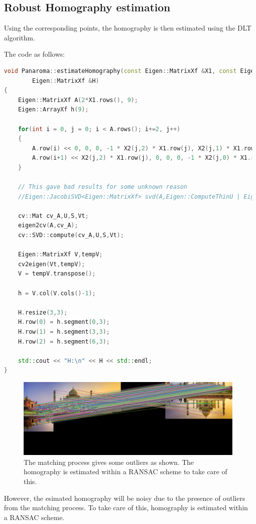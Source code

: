 \documentclass[a4paper,11]{article}
\begin{document}
  \subsection{Robust Homography estimation}
  
    Using the corresponding points, the homography is then estimated using the DLT algorithm.
    
    \noindent The code as follows:
    \begin{lstlisting}[language=C++]
void Panaroma::estimateHomography(const Eigen::MatrixXf &X1, const Eigen::MatrixXf &X2,
    	Eigen::MatrixXf &H)
{
	Eigen::MatrixXf A(2*X1.rows(), 9);
	Eigen::ArrayXf h(9);

	for(int i = 0, j = 0; i < A.rows(); i+=2, j++)
	{
		A.row(i) << 0, 0, 0, -1 * X2(j,2) * X1.row(j), X2(j,1) * X1.row(j);
		A.row(i+1) << X2(j,2) * X1.row(j), 0, 0, 0, -1 * X2(j,0) * X1.row(j);
	}

	// This gave bad results for some unknown reason
	//Eigen::JacobiSVD<Eigen::MatrixXf> svd(A,Eigen::ComputeThinU | Eigen::ComputeThinV);

	cv::Mat cv_A,U,S,Vt;
	eigen2cv(A,cv_A);
	cv::SVD::compute(cv_A,U,S,Vt);

	Eigen::MatrixXf V,tempV;
	cv2eigen(Vt,tempV);
	V = tempV.transpose();

	h = V.col(V.cols()-1);

	H.resize(3,3);
	H.row(0) = h.segment(0,3);
	H.row(1) = h.segment(3,3);
	H.row(2) = h.segment(6,3);

	std::cout << "H:\n" << H << std::endl;
}\end{lstlisting}
    \vspace{1em}
    
    \begin{figure}
    \centering
    \includegraphics[width=0.8\linewidth]{h-robust}
    \caption{The matching process gives some outliers as shown. The homography is estimated within a RANSAC scheme to take care of this.}
  \end{figure}
  
  However, the esimated homography will be noisy due to the presence of outliers from the matching process. To take care of this, homography is estimated within a RANSAC scheme.
  
\end{document}
